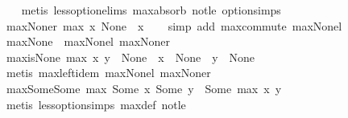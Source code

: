 \begin{isabellebody}
\ \ %
\endisadelimproof
%
\isatagproof
{}\isamarkupfalse%
\ {\isacharparenleft}metis\ less{\isacharunderscore}option{\isachardot}elims{\isacharparenleft}{}{\isacharparenright}\ max{\isachardot}absorb{}\ not{\isacharunderscore}le\ option{\isachardot}simps{\isacharparenleft}{}{\isacharparenright}{\isacharparenright}%
\endisatagproof
{\isafoldproof}%
%
\isadelimproof
\isanewline
%
\endisadelimproof
\isanewline
{}\isamarkupfalse%
\ max{\isacharunderscore}None{\isacharunderscore}r{\isacharcolon}\ {\isachardoublequoteopen}max\ x\ None\ {\isacharequal}\ x{\isachardoublequoteclose}\isanewline
%
\isadelimproof
\ \ %
\endisadelimproof
%
\isatagproof
{}\isamarkupfalse%
\ {\isacharparenleft}simp\ add{\isacharcolon}\ max{\isachardot}commute\ max{\isacharunderscore}None{\isacharunderscore}l{\isacharparenright}%
\endisatagproof
{\isafoldproof}%
%
\isadelimproof
\isanewline
%
\endisadelimproof
\isanewline
{}\isamarkupfalse%
\ max{\isacharunderscore}None\ {\isacharequal}\ max{\isacharunderscore}None{\isacharunderscore}l\ max{\isacharunderscore}None{\isacharunderscore}r\isanewline
\isanewline
{}\isamarkupfalse%
\ max{\isacharunderscore}is{\isacharunderscore}None{\isacharcolon}\ {\isachardoublequoteopen}{\isacharparenleft}max\ x\ y\ {\isacharequal}\ None{\isacharparenright}\ {\isacharequal}\ {\isacharparenleft}x\ {\isacharequal}\ None\ {\isasymand}\ y\ {\isacharequal}\ None{\isacharparenright}{\isachardoublequoteclose}\isanewline
%
\isadelimproof
\ \ %
\endisadelimproof
%
\isatagproof
{}\isamarkupfalse%
\ {\isacharparenleft}metis\ max{\isachardot}left{\isacharunderscore}idem\ max{\isacharunderscore}None{\isacharunderscore}l\ max{\isacharunderscore}None{\isacharunderscore}r{\isacharparenright}%
\endisatagproof
{\isafoldproof}%
%
\isadelimproof
\isanewline
%
\endisadelimproof
\isanewline
{}\isamarkupfalse%
\ max{\isacharunderscore}Some{\isacharunderscore}Some{\isacharcolon}\ {\isachardoublequoteopen}max\ {\isacharparenleft}Some\ x{\isacharparenright}\ {\isacharparenleft}Some\ y{\isacharparenright}\ {\isacharequal}\ Some\ {\isacharparenleft}max\ x\ y{\isacharparenright}{\isachardoublequoteclose}\isanewline
%
\isadelimproof
\ \ %
\endisadelimproof
%
\isatagproof
{}\isamarkupfalse%
\ {\isacharparenleft}metis\ less{\isacharunderscore}option{\isachardot}simps{\isacharparenleft}{}{\isacharparenright}\ max{\isacharunderscore}def\ not{\isacharunderscore}le{\isacharparenright}%
\endisatagproof
{\isafoldproof}%
%
\isadelimproof

\end{isabellebody}
